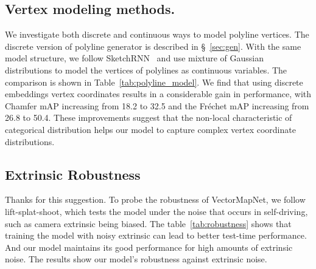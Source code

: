 \documentclass{article}
\newcommand{\ra}[1]{\renewcommand{\arraystretch}{#1}}
\theoremstyle{plain}
\theoremstyle{definition}
\theoremstyle{remark}
\begin{document}
\subsection{Vertex modeling methods.} 
\label{subsec:vertexmodeling}
\begin{table}[h] \centering
    \ra{1.3}
    \caption{ 
        Ablation study of vertex modeling methods. 
}
    \label{tab:polyline_model}
\end{table} We investigate both discrete and continuous ways to model polyline vertices. The discrete version of polyline generator is described in \S~\ref{sec:gen}. With the same model structure, we follow SketchRNN~\citep{ha2017neural} and use mixture of Gaussian distributions to model the vertices of polylines as continuous variables. The comparison is shown in Table~\ref{tab:polyline_model}.
We find that using discrete embeddings vertex coordinates results in a considerable gain in performance, with Chamfer mAP increasing from 18.2 to 32.5 and the Fr\'echet mAP increasing from 26.8 to 50.4. 
These improvements suggest that the non-local characteristic of categorical distribution helps our model to capture complex vertex coordinate distributions.

\subsection{Extrinsic Robustness}
Thanks for this suggestion. To probe the robustness of VectorMapNet, we follow lift-splat-shoot\cite{philion2020lift}, which tests the model under the noise that occurs in self-driving, such as camera extrinsic being biased.
The table~\ref{tab:robustness} shows that training the model with noisy extrinsic can lead to better test-time performance. And our model maintains its good performance for high amounts of extrinsic noise. The results show our model's robustness against extrinsic noise.
\end{document}
